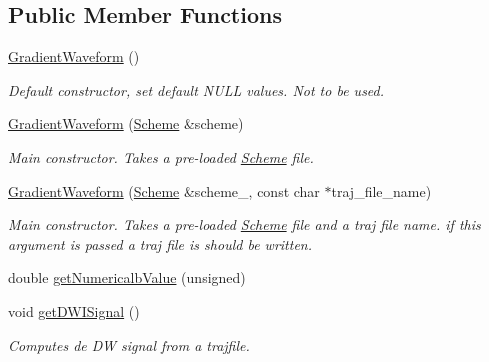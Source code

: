 \subsection*{Public Member Functions}
\begin{DoxyCompactItemize}
\item 
\mbox{\label{class_gradient_waveform_acf951c9a86f95d002db4858ee4c78582}} 
\hyperlink{class_gradient_waveform_acf951c9a86f95d002db4858ee4c78582}{Gradient\+Waveform} ()
\begin{DoxyCompactList}\small\item\em Default constructor, set default N\+U\+LL values. Not to be used. \end{DoxyCompactList}\item 
\mbox{\label{class_gradient_waveform_aad3922dbe19647ed0fcbba175fb9a5ff}} 
\hyperlink{class_gradient_waveform_aad3922dbe19647ed0fcbba175fb9a5ff}{Gradient\+Waveform} (\hyperlink{class_scheme}{Scheme} \&scheme)
\begin{DoxyCompactList}\small\item\em Main constructor. Takes a pre-\/loaded \hyperlink{class_scheme}{Scheme} file. \end{DoxyCompactList}\item 
\mbox{\label{class_gradient_waveform_a4780653a03ac1f576aeb6102b910ccde}} 
\hyperlink{class_gradient_waveform_a4780653a03ac1f576aeb6102b910ccde}{Gradient\+Waveform} (\hyperlink{class_scheme}{Scheme} \&scheme\+\_\+, const char $\ast$traj\+\_\+file\+\_\+name)
\begin{DoxyCompactList}\small\item\em Main constructor. Takes a pre-\/loaded \hyperlink{class_scheme}{Scheme} file and a traj file name. if this argument is passed a traj file is should be written. \end{DoxyCompactList}\item 
double \hyperlink{class_gradient_waveform_a5f55e43b3057509b0f98812d2a72db9a}{get\+Numericalb\+Value} (unsigned)
\item 
\mbox{\label{class_gradient_waveform_a52971b5f773c8c0b7c43bcd5fc50197a}} 
void \hyperlink{class_gradient_waveform_a52971b5f773c8c0b7c43bcd5fc50197a}{get\+D\+W\+I\+Signal} ()
\begin{DoxyCompactList}\small\item\em Computes de DW signal from a trajfile. \end{DoxyCompactList}\item 

\end{DoxyCompactItemize}
